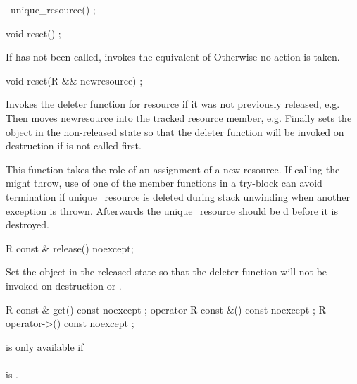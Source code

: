 \documentclass[ebook,11pt,article]{memoir}
\begin{document}
\begin{itemdecl}
~unique_resource() ;
\end{itemdecl}

\pnum
\effects {}

\begin{itemdecl}
void reset() ;
\end{itemdecl}

\pnum
\effects If  has not been called, invokes the equivalent of   Otherwise no action is taken.

\begin{itemdecl}
void reset(R && newresource) ;
\end{itemdecl}

\pnum
\effects Invokes the deleter function for resource if it was not previously released, e.g.   Then moves newresource into the tracked resource member, e.g.   Finally sets the object in the non-released state so that the deleter function will be invoked on destruction if  is not called first.

\pnum
\enternote This function takes the role of an assignment of a new resource.
\exitnote
\enternote If calling the  might throw, use of one of the  member functions in a try-block can avoid termination if unique_resource is deleted during stack unwinding when another exception is thrown. Afterwards the unique_resource should be d before it is destroyed.
\exitnote

\begin{itemdecl}
R const & release() noexcept;
\end{itemdecl}

\pnum
\effects Set the object in the released state so that the deleter function will not be invoked on destruction or .

\pnum
\returns {}


\begin{itemdecl}
R const & get() const noexcept ;
operator  R const &() const noexcept ;
R operator->() const noexcept ;
\end{itemdecl}

\pnum
\requires {} is only available if \\
\\ is . 
\end{document}

